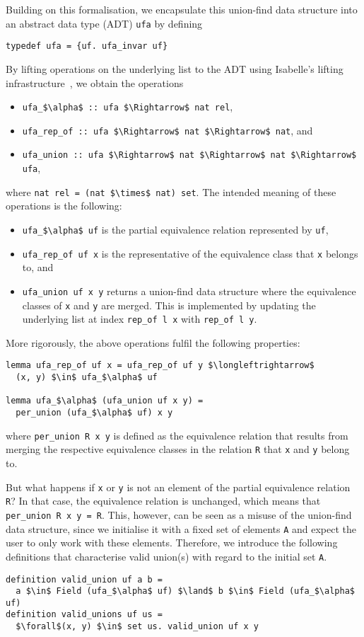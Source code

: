 \documentclass[
  sigplan,
  10pt,
  anonymous,
  review,
  ]{acmart}
\begin{document}
Building on this formalisation, we encapsulate this union-find data structure into an abstract data type (ADT) \lstinline|ufa| by defining
\begin{lstlisting}
typedef ufa = {uf. ufa_invar uf}
\end{lstlisting}
By lifting operations on the underlying list to the ADT using Isabelle's lifting infrastructure~\cite{lifting_transfer}, we obtain the operations
\begin{itemize}
  \item \lstinline!ufa_$\alpha$ :: ufa $\Rightarrow$ nat rel!,
  \item \lstinline!ufa_rep_of :: ufa $\Rightarrow$ nat $\Rightarrow$ nat!, and
  \item \lstinline!ufa_union :: ufa $\Rightarrow$ nat $\Rightarrow$ nat $\Rightarrow$ ufa!,
\end{itemize}
where \lstinline!nat rel = (nat $\times$ nat) set!.
The intended meaning of these operations is the following:
\begin{itemize}
  \item \lstinline!ufa_$\alpha$ uf! is the partial equivalence relation represented by \lstinline!uf!,
  \item \lstinline!ufa_rep_of uf x! is the representative of the equivalence class that \lstinline!x! belongs to, and
  \item \lstinline!ufa_union uf x y! returns a union-find data structure where the equivalence classes of \lstinline!x! and \lstinline!y! are merged.
    This is implemented by updating the underlying list at index \lstinline!rep_of l x! with \lstinline|rep_of l y|.
\end{itemize}
More rigorously, the above operations fulfil the following properties:
\begin{lstlisting}
lemma ufa_rep_of uf x = ufa_rep_of uf y $\longleftrightarrow$
  (x, y) $\in$ ufa_$\alpha$ uf

lemma ufa_$\alpha$ (ufa_union uf x y) =
  per_union (ufa_$\alpha$ uf) x y
\end{lstlisting}
where \lstinline!per_union R x y! is defined as the equivalence relation that results from merging the respective equivalence classes in the relation \lstinline|R| that \lstinline!x! and \lstinline!y! belong to.

But what happens if \lstinline!x! or \lstinline!y! is not an element of the partial equivalence relation \lstinline|R|?
In that case, the equivalence relation is unchanged, which means that \lstinline|per_union R x y = R|.
This, however, can be seen as a misuse of the union-find data structure, since we initialise it with a fixed set of elements \lstinline|A| and expect the user to only work with these elements.
Therefore, we introduce the following definitions that characterise valid union(s) with regard to the initial set \lstinline|A|.
\begin{lstlisting}
definition valid_union uf a b =
  a $\in$ Field (ufa_$\alpha$ uf) $\land$ b $\in$ Field (ufa_$\alpha$ uf)
definition valid_unions uf us =
  $\forall$(x, y) $\in$ set us. valid_union uf x y
\end{lstlisting}
\end{document}
